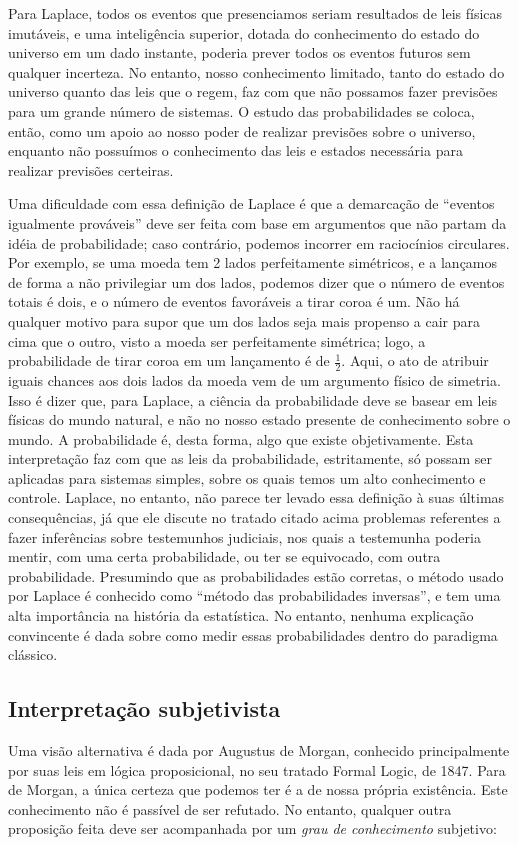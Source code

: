 \documentclass[12pt,a4paper]{article}
\begin{document}
Para Laplace, todos os eventos que presenciamos seriam resultados de leis físicas
imutáveis, e uma inteligência superior, dotada do conhecimento do estado do universo em um dado instante, poderia prever
todos os eventos futuros sem qualquer incerteza. No entanto, nosso conhecimento limitado, tanto do estado do universo
quanto das leis que o regem, faz com que não possamos fazer previsões para um grande número de sistemas. O estudo das 
probabilidades se coloca, então, como um apoio ao nosso poder de realizar previsões sobre o universo, 
enquanto não possuímos o conhecimento das leis e estados necessária para realizar previsões certeiras. 

Uma dificuldade com essa definição de Laplace é que a demarcação de ``eventos igualmente prováveis'' deve ser feita
com base em argumentos que não partam da idéia de probabilidade; caso contrário, podemos incorrer em raciocínios
circulares. Por exemplo, se uma moeda tem 2 lados perfeitamente simétricos, e a lançamos de forma a não privilegiar um dos lados,
podemos dizer que o número de eventos totais é dois, e o número de eventos favoráveis a tirar coroa é um. Não há qualquer motivo
para supor que um dos lados seja mais propenso a cair para cima que o outro, visto a moeda ser perfeitamente simétrica; logo,
a probabilidade de tirar coroa em um lançamento é de $\frac{1}{2}$. Aqui, o ato de atribuir iguais chances aos dois
lados da moeda vem de um argumento físico de simetria. Isso é dizer que, para Laplace,
a ciência da probabilidade deve se basear em leis físicas do mundo natural, e não no nosso estado presente de conhecimento 
sobre o mundo. A probabilidade é, desta forma, algo que existe objetivamente.
Esta interpretação faz com que as leis da probabilidade, estritamente, só possam ser aplicadas para 
sistemas simples, sobre os quais temos um alto conhecimento e controle. Laplace, no entanto, não parece ter levado essa 
definição à suas últimas consequências, já que ele discute no tratado citado acima problemas referentes a fazer inferências 
sobre testemunhos judiciais, nos 
quais a testemunha poderia mentir, com uma certa probabilidade, ou ter se equivocado, com outra probabilidade. 
Presumindo que as probabilidades estão corretas, o método usado por Laplace é conhecido como ``método das probabilidades
inversas'', e tem uma alta importância na história da estatística.
No entanto, 
nenhuma explicação convincente é dada sobre como medir essas probabilidades dentro do paradigma clássico.

\subsection{Interpretação subjetivista}
Uma visão alternativa é dada por Augustus de Morgan, conhecido principalmente por suas leis em lógica proposicional, 
no seu tratado Formal Logic, de 1847. Para de Morgan, a única certeza que podemos ter é a de nossa própria existência. 
Este conhecimento
não é passível de ser refutado. No entanto, qualquer outra proposição feita deve ser acompanhada por 
um {\em grau de conhecimento} subjetivo:
\end{document}
